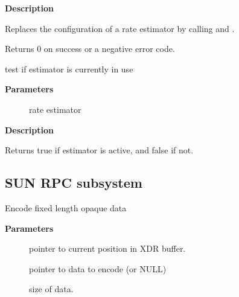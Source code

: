 \documentclass[a4paper,8pt,english]{sphinxmanual}
\begin{document}
\textbf{Description}

Replaces the configuration of a rate estimator by calling
{\hyperref[networking/kapi:c.gen_kill_estimator]{\emph{}}} and {\hyperref[networking/kapi:c.gen_new_estimator]{\emph{}}}.

Returns 0 on success or a negative error code.

\begin{fulllineitems}
\label{networking/kapi:c.gen_estimator_active}
test if estimator is currently in use

\end{fulllineitems}


\textbf{Parameters}
\begin{description}
\item[{}] \leavevmode
rate estimator

\end{description}

\textbf{Description}

Returns true if estimator is active, and false if not.


\subsection{SUN RPC subsystem}
\label{networking/kapi:sun-rpc-subsystem}

\begin{fulllineitems}
\label{networking/kapi:c.xdr_encode_opaque_fixed}
Encode fixed length opaque data

\end{fulllineitems}


\textbf{Parameters}
\begin{description}
\item[{}] \leavevmode
pointer to current position in XDR buffer.

\item[{}] \leavevmode
pointer to data to encode (or NULL)

\item[{}] \leavevmode
size of data.

\end{description}
\end{document}

